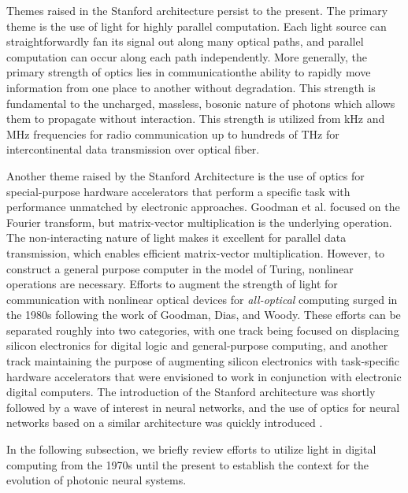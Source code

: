 Themes raised in the Stanford architecture persist to the present. The primary theme is the use of light for highly parallel computation. Each light source can straightforwardly fan its signal out along many optical paths, and parallel computation can occur along each path independently. More generally, the primary strength of optics lies in communication\textemdash the ability to rapidly move information from one place to another without degradation. This strength is fundamental to the uncharged, massless, bosonic nature of photons which allows them to propagate without interaction. This strength is utilized from kHz and MHz frequencies for radio communication up to hundreds of THz for intercontinental data transmission over optical fiber.

Another theme raised by the Stanford Architecture is the use of optics for special-purpose hardware accelerators that perform a specific task with performance unmatched by electronic approaches. Goodman et al. focused on the Fourier transform, but matrix-vector multiplication is the underlying operation. The non-interacting nature of light makes it excellent for parallel data transmission, which enables efficient matrix-vector multiplication. However, to construct a general purpose computer in the model of Turing, nonlinear operations are necessary. Efforts to augment the strength of light for communication with nonlinear optical devices for \textit{all-optical} computing surged in the 1980s following the work of Goodman, Dias, and Woody. These efforts can be separated roughly into two categories, with one track being focused on displacing silicon electronics for digital logic and general-purpose computing, and another track maintaining the purpose of augmenting silicon electronics with task-specific hardware accelerators that were envisioned to work in conjunction with electronic digital computers. The introduction of the Stanford architecture was shortly followed by a wave of interest in neural networks, and the use of optics for neural networks based on a similar architecture was quickly introduced \cite{psfa1985}.

In the following subsection, we briefly review efforts to utilize light in digital computing from the 1970s until the present to establish the context for the evolution of photonic neural systems.

